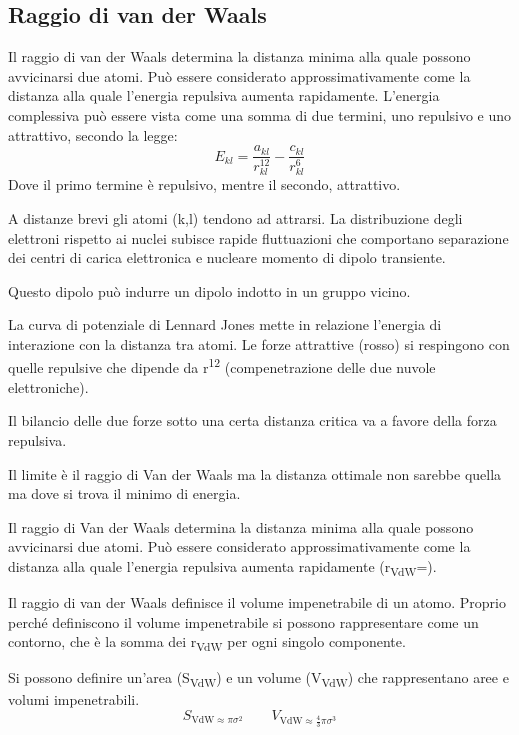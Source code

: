 \subsection{Raggio di van der Waals}

Il raggio di van der Waals determina la
distanza minima alla quale possono
avvicinarsi due atomi. Può essere
considerato approssimativamente come la
distanza alla quale l’energia repulsiva
aumenta rapidamente. L'energia complessiva può essere vista come una somma di due termini, uno repulsivo e uno attrattivo, secondo la legge:
\[
  E_{kl} = \frac{a_{kl}}{r_{kl}^{12}} - \frac{c_{kl}}{r_{kl}^6}
\]
Dove il primo termine è repulsivo, mentre il secondo, attrattivo.

A distanze brevi gli atomi (k,l) tendono ad attrarsi. La distribuzione
degli elettroni rispetto ai nuclei subisce rapide fluttuazioni che
comportano separazione dei centri di carica elettronica e nucleare momento di dipolo transiente.


Questo dipolo può indurre un dipolo indotto in un gruppo vicino.

La curva di potenziale di Lennard Jones mette in relazione l'energia di
interazione con la distanza tra atomi. Le forze attrattive (rosso) si
respingono con quelle repulsive che dipende da r\textsuperscript{12}
(compenetrazione delle due nuvole elettroniche).


Il bilancio delle due forze sotto una certa distanza critica va a favore
della forza repulsiva.

Il limite è il raggio di Van der Waals ma la distanza ottimale non
sarebbe quella ma dove si trova il minimo di energia.

Il raggio di Van der Waals determina la distanza minima alla quale possono
avvicinarsi due atomi. Può essere considerato approssimativamente come
la distanza alla quale l'energia repulsiva aumenta rapidamente
(r\textsubscript{VdW}=\sigma).


Il raggio di van der Waals definisce il volume impenetrabile di un atomo.
Proprio perché definiscono il volume impenetrabile si possono
rappresentare come un contorno, che è la somma dei r\textsubscript{VdW}
per ogni singolo componente.

Si possono definire un'area (S\textsubscript{VdW}) e un volume
(V\textsubscript{VdW}) che rappresentano aree e volumi impenetrabili.
\[
  S_{\text{VdW} \approx \pi \sigma^2} \qquad V_{\text{VdW} \approx \frac{4}{3} \pi \sigma^3}
\]

